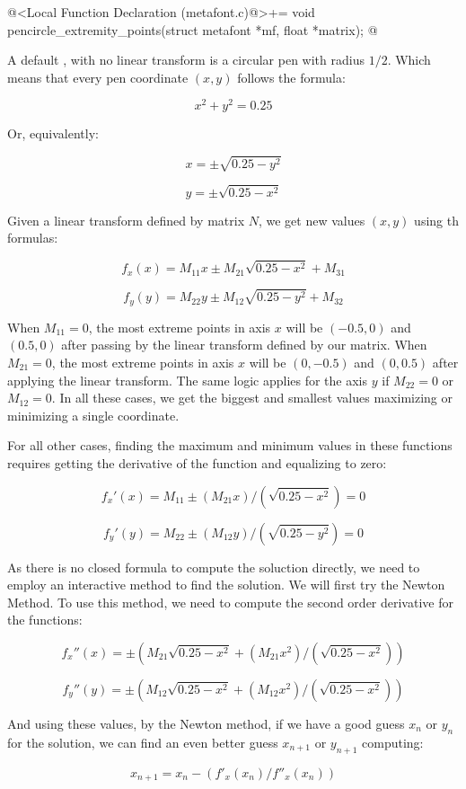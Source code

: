 {{{{{\iniciocodigo
@<Local Function Declaration (metafont.c)@>+=
void pencircle_extremity_points(struct metafont *mf, float *matrix);
@
\fimcodigo

A default , with no linear transform is a
circular pen with radius $1/2$. Which means that every pen coordinate
$(x, y)$ follows the formula:

$$
x^2+y^2= 0.25
$$

Or, equivalently:

$$
x=\pm\sqrt{0.25-y^2}
$$

$$
y=\pm\sqrt{0.25-x^2}
$$

Given a linear transform defined by matrix $N$, we get new values
$(x,y)$ using th formulas:

$$
f_x(x) = M_{11}x \pm M_{21}\sqrt{0.25-x^2} + M_{31}
$$

$$
f_y(y) = M_{22}y \pm M_{12}\sqrt{0.25-y^2} + M_{32}
$$

When $M_{11}=0$, the most extreme points in axis $x$ will be $(-0.5,
0)$ and $(0.5, 0)$ after passing by the linear transform defined by
our matrix. When $M_{21}=0$, the most extreme points in axis $x$ will
be $(0, -0.5)$ and $(0, 0.5)$ after applying the linear transform. The
same logic applies for the axis $y$ if $M_{22}=0$ or $M_{12}=0$. In
all these cases, we get the biggest and smallest values maximizing or
minimizing a single coordinate.

For all other cases, finding the maximum and minimum values in these
functions requires getting the derivative of the function and
equalizing to zero:

$$
f_x'(x)=M_{11} \pm (M_{21}x)/(\sqrt{0.25-x^2})=0
$$

$$
f_y'(y)=M_{22} \pm (M_{12}y)/(\sqrt{0.25-y^2})=0
$$

As there is no closed formula to compute the soluction directly, we
need to employ an interactive method to find the solution. We will
first try the Newton Method. To use this method, we need to compute
the second order derivative for the functions:

$$
f_x''(x)= \pm (M_{21}\sqrt{0.25-x^2}+(M_{21}x^2)/(\sqrt{0.25-x^2}))
$$

$$
f_y''(y)= \pm (M_{12}\sqrt{0.25-x^2}+(M_{12}x^2)/(\sqrt{0.25-x^2}))
$$

And using these values, by the Newton method, if we have a good guess
$x_n$ or $y_n$ for the solution, we can find an even better guess
$x_{n+1}$ or $y_{n+1}$ computing:

$$
x_{n+1} = x_{n} - (f'_x(x_n)/f''_x(x_n))
$$

}}}}}
